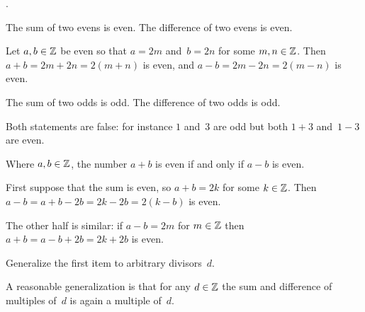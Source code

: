 \documentclass{ibl}  %
\begin{document}
\begin{problem} 
\pord.
\begin{exes}
\begin{exercise}
  The sum of two evens is even.
  The difference of two evens is even.  
\end{exercise}
\begin{answer}
  Let $a,b\in\mathbb{Z}$ be even so that $a=2m$ and~$b=2n$ for some $m,n\in\mathbb{Z}$.
  Then $a+b=2m+2n=2(m+n)$ is even, and $a-b=2m-2n=2(m-n)$ is even.  
\end{answer}

\begin{exercise}
  The sum of two odds is odd. 
  The difference of two odds is odd.  
\end{exercise}
\begin{answer}
  Both statements are false: for instance $1$ and~$3$ are odd
  but both $1+3$ and~$1-3$ are even.  
\end{answer}

\begin{exercise}
  Where $a,b\in\mathbb{Z}$, the number $a+b$ is even if and only if $a-b$ is even.
\end{exercise}
\begin{answer}
  First suppose that the sum is even, so $a+b=2k$ for some $k\in\mathbb{Z}$.
  Then $a-b=a+b-2b=2k-2b=2(k-b)$ is even.

  The other half is similar:
  if $a-b=2m$ for $m\in\mathbb{Z}$ then $a+b=a-b+2b=2k+2b$ is even.  
\end{answer}

\begin{exercise}
  Generalize the first item to arbitrary divisors~$d$.
\end{exercise}
\begin{answer}
  A reasonable generalization is that for any $d\in\mathbb{Z}$
  the sum and difference of multiples of~$d$ is again a multiple of~$d$.
 

\end{answer}
\end{exes}
\end{problem}
\end{document}
